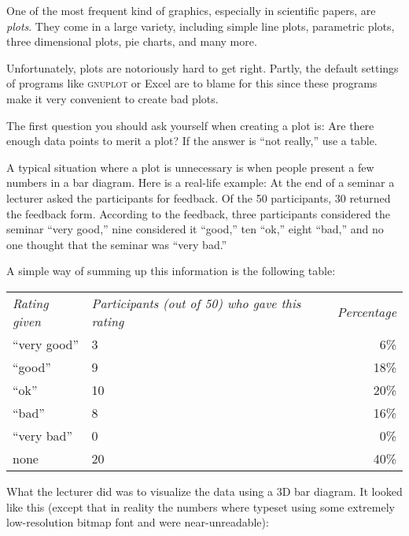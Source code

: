 One of the most frequent kind of graphics, especially in scientific
papers, are \emph{plots}. They come in a large variety, including
simple line plots, parametric plots, three dimensional plots, pie
charts, and many more.

Unfortunately, plots are notoriously hard to get right. Partly, the
default settings of programs like \textsc{gnuplot} or Excel are to
blame for this since these programs make it very convenient to create
bad plots.

The first question you should ask yourself when creating a plot is:
Are there enough data points to merit a plot? If the answer is ``not
really,'' use a table.

A typical situation where a plot is unnecessary is when people present
a few numbers in a bar diagram. Here is a real-life example: At the
end of a seminar a lecturer asked the participants for feedback. Of
the 50 participants, 30 returned the feedback form. According to the
feedback, three participants considered the seminar ``very good,''
nine considered it  ``good,'' ten ``ok,'' eight ``bad,'' and no one thought
that the seminar was ``very bad.''

A simple way of summing up this information is the following table:

\medskip
\begin{tabular}{lp{3.75cm}r}
  \emph{Rating given} & \raggedright\emph{Participants (out of 50) who gave this rating} &
  \emph{Percentage} \\[1.75em]
  ``very good'' & \hfil\hphantom{0}3\hfil & \hphantom{0}6\% \\
  ``good'' & \hfil\hphantom{0}9\hfil & 18\% \\
  ``ok'' & \hfil10\hfil & 20\% \\
  ``bad'' & \hfil\hphantom{0}8\hfil & 16\% \\
  ``very bad'' & \hfil\hphantom{0}0\hfil & \hphantom{0}0\% \\[2mm]
  none & \hfil20\hfil & 40\% \\
\end{tabular}

\bigskip
What the lecturer did was to visualize the data using a 3D bar
diagram. It looked like this (except that in reality the numbers
where typeset using some extremely low-resolution bitmap font and
were near-unreadable):

